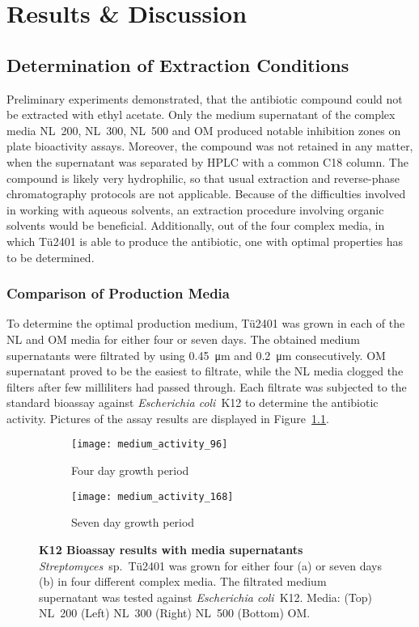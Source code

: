 \chapter{Results \& Discussion}

\section{Determination of Extraction Conditions} %
\label{sec:determination_of_extraction_conditions}

	Preliminary experiments demonstrated, that the antibiotic compound could not be extracted with ethyl acetate.
	Only the medium supernatant of the complex media NL~200, NL~300, NL~500 and OM produced notable inhibition zones on plate bioactivity assays.
	Moreover, the compound was not retained in any matter, when the supernatant was separated by HPLC with a common C18 column.
	The compound is likely very hydrophilic, so that usual extraction and reverse-phase chromatography protocols are not applicable.
	Because of the difficulties involved in working with aqueous solvents, an extraction procedure involving organic solvents would be beneficial.
	Additionally, out of the four complex media, in which Tü2401 is able to produce the antibiotic, one with optimal properties has to be determined.

\subsection{Comparison of Production Media} %
\label{sub:comparison_of_production_media}

	To determine the optimal production medium, Tü2401 was grown in each of the NL and OM media for either four or seven days.
	The obtained medium supernatants were filtrated by using \SI{0.45}{\micro\meter} and \SI{0.2}{\micro\meter} consecutively.
	OM supernatant proved to be the easiest to filtrate, while the NL media clogged the filters after few milliliters had passed through.
	Each filtrate was subjected to the standard bioassay against \textit{Escherichia coli}~K12 to determine the antibiotic activity.
	Pictures of the assay results are displayed in Figure~\ref{fig:medium_activity}.
	
	\begin{figure}[htbp]
	\centering
		\begin{subfigure}{0.5\textwidth}
			\texttt{[image: medium\_activity\_96]}
			\caption{Four day growth period}
		\end{subfigure}%
		\begin{subfigure}{0.5\textwidth}
			\texttt{[image: medium\_activity\_168]}
			\caption{Seven day growth period}
		\end{subfigure}
		\caption[K12 Bioassay results with media supernatants]{%
			\textbf{K12 Bioassay results with media supernatants}
			\textit{Streptomyces}~sp.~Tü2401 was grown for either four (a) or seven days (b) in four different complex media.
			The filtrated medium supernatant was tested against \textit{Escherichia coli}~K12.
			Media: (Top) NL~200 (Left) NL~300 (Right) NL~500 (Bottom) OM.}
		\label{fig:medium_activity}
	\end{figure}
	
